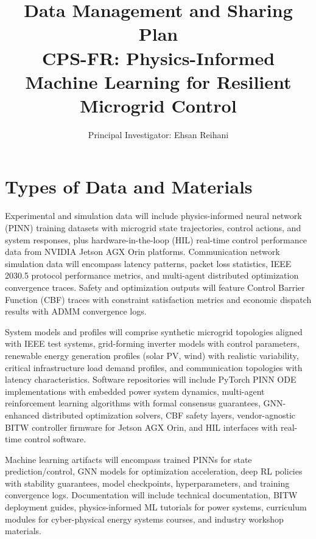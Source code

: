 \documentclass[12pt]{article}
\begin{document}
\title{\large\textbf{Data Management and Sharing Plan\\CPS-FR: Physics-Informed Machine Learning for Resilient Microgrid Control}}
\author{Principal Investigator: Ehsan Reihani}
\date{}

\maketitle
\vspace{-1.0cm}

\section{Types of Data and Materials}

Experimental and simulation data will include physics-informed neural network (PINN) training datasets with microgrid state trajectories, control actions, and system responses, plus hardware-in-the-loop (HIL) real-time control performance data from NVIDIA Jetson AGX Orin platforms. Communication network simulation data will encompass latency patterns, packet loss statistics, IEEE 2030.5 protocol performance metrics, and multi-agent distributed optimization convergence traces. Safety and optimization outputs will feature Control Barrier Function (CBF) traces with constraint satisfaction metrics and economic dispatch results with ADMM convergence logs.

System models and profiles will comprise synthetic microgrid topologies aligned with IEEE test systems, grid-forming inverter models with control parameters, renewable energy generation profiles (solar PV, wind) with realistic variability, critical infrastructure load demand profiles, and communication topologies with latency characteristics. Software repositories will include PyTorch PINN ODE implementations with embedded power system dynamics, multi-agent reinforcement learning algorithms with formal consensus guarantees, GNN-enhanced distributed optimization solvers, CBF safety layers, vendor-agnostic BITW controller firmware for Jetson AGX Orin, and HIL interfaces with real-time control software.

Machine learning artifacts will encompass trained PINNs for state prediction/control, GNN models for optimization acceleration, deep RL policies with stability guarantees, model checkpoints, hyperparameters, and training convergence logs. Documentation will include technical documentation, BITW deployment guides, physics-informed ML tutorials for power systems, curriculum modules for cyber-physical energy systems courses, and industry workshop materials.
\end{document}
